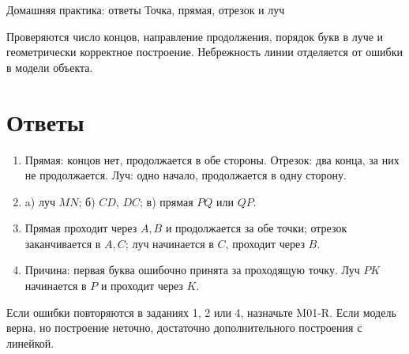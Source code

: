 \worksheettitle
  {Домашняя практика: ответы}
  { Точка, прямая, отрезок и луч}

\begin{teacherbox}[Критерии]
  Проверяются число концов, направление продолжения, порядок букв в луче и
  геометрически корректное построение. Небрежность линии отделяется от ошибки
  в модели объекта.
\end{teacherbox}

\section{Ответы}

\begin{enumerate}
  \item Прямая: концов нет, продолжается в обе стороны. Отрезок: два конца,
    за них не продолжается. Луч: одно начало, продолжается в одну сторону.
  \item a) луч $MN$; б) $CD$, $DC$; в) прямая $PQ$ или $QP$.
  \item Прямая проходит через $A,B$ и продолжается за обе точки; отрезок
    заканчивается в $A,C$; луч начинается в $C$, проходит через $B$.
  \item Причина: первая буква ошибочно принята за проходящую точку. Луч
    $PK$ начинается в $P$ и проходит через $K$.
\end{enumerate}

\begin{resultbox}[Маршрут]
  Если ошибки повторяются в заданиях 1, 2 или 4, назначьте M01-R. Если модель
  верна, но построение неточно, достаточно дополнительного построения с
  линейкой.
\end{resultbox}
